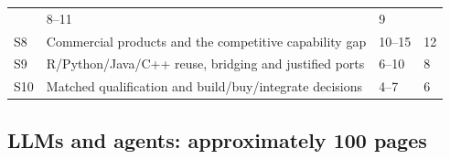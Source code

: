 \documentclass[
  11pt,
  a4paper,
]{article}
\begin{document}
\begin{longtable}[]{@{}llll@{}}
\begin{minipage}[t]{0.22\columnwidth}
\end{minipage} & \begin{minipage}[t]{0.22\columnwidth}\raggedright
8--11\strut
\end{minipage} & \begin{minipage}[t]{0.22\columnwidth}\raggedright
9\strut
\end{minipage}\tabularnewline
\begin{minipage}[t]{0.22\columnwidth}\raggedright
S8\strut
\end{minipage} & \begin{minipage}[t]{0.22\columnwidth}\raggedright
Commercial products and the competitive capability gap\strut
\end{minipage} & \begin{minipage}[t]{0.22\columnwidth}\raggedright
10--15\strut
\end{minipage} & \begin{minipage}[t]{0.22\columnwidth}\raggedright
12\strut
\end{minipage}\tabularnewline
\begin{minipage}[t]{0.22\columnwidth}\raggedright
S9\strut
\end{minipage} & \begin{minipage}[t]{0.22\columnwidth}\raggedright
R/Python/Java/C++ reuse, bridging and justified ports\strut
\end{minipage} & \begin{minipage}[t]{0.22\columnwidth}\raggedright
6--10\strut
\end{minipage} & \begin{minipage}[t]{0.22\columnwidth}\raggedright
8\strut
\end{minipage}\tabularnewline
\begin{minipage}[t]{0.22\columnwidth}\raggedright
S10\strut
\end{minipage} & \begin{minipage}[t]{0.22\columnwidth}\raggedright
Matched qualification and build/buy/integrate decisions\strut
\end{minipage} & \begin{minipage}[t]{0.22\columnwidth}\raggedright
4--7\strut
\end{minipage} & \begin{minipage}[t]{0.22\columnwidth}\raggedright
6\strut
\end{minipage}\tabularnewline
\bottomrule
\end{longtable}

\hypertarget{llms-and-agents-approximately-100-pages}{%
\subsection{LLMs and agents: approximately 100
pages}\label{llms-and-agents-approximately-100-pages}}
\end{document}
